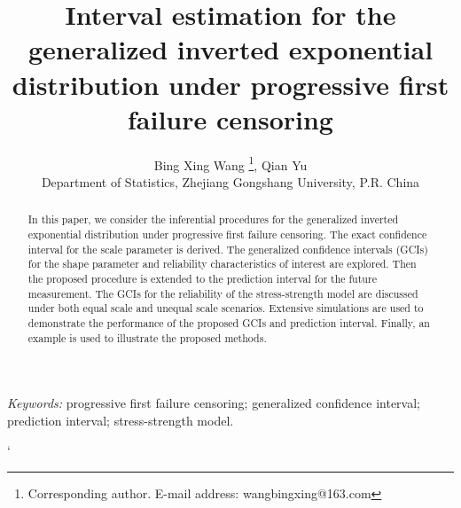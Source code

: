 \documentclass[12pt]{article}
\begin{document}

%

\def\spacingset#1{\renewcommand{\baselinestretch}%
{#1}\small\normalsize} \spacingset{1}



\date{} %
\title{Interval estimation for the generalized inverted exponential distribution under progressive first failure censoring}
\author{Bing Xing Wang \footnote{Corresponding author.  E-mail address: wangbingxing@163.com}, Qian Yu\\
\normalsize{Department of Statistics, Zhejiang Gongshang University, P.R. China}}

\maketitle

\bigskip
\begin{abstract}
In this paper, we consider the inferential procedures for the generalized inverted exponential distribution under progressive first failure censoring. The exact confidence interval for the scale parameter is derived. The generalized confidence intervals (GCIs) for the shape parameter and reliability characteristics of interest are explored. Then the proposed procedure is extended to the prediction interval for the future measurement. The GCIs for the reliability of the stress-strength model are discussed under both equal scale and unequal scale scenarios. Extensive simulations are used to demonstrate the performance of the proposed GCIs and prediction interval. Finally, an example is used to illustrate the proposed methods.
\end{abstract}

\noindent%
{\it Keywords:}  progressive first failure censoring; generalized confidence interval; prediction interval; stress-strength model.

	`
\spacingset{1.45} %
\end{document}
